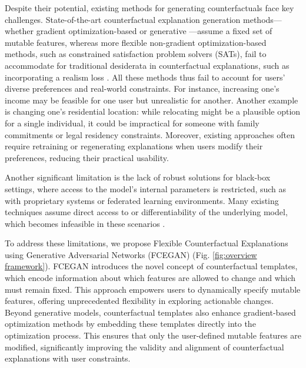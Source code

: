 \documentclass[runningheads]{llncs}
\begin{document}
Despite their potential, existing methods for generating counterfactuals face key challenges. State-of-the-art counterfactual explanation generation methods— whether gradient optimization-based \cite{poyiadzi2020face,joshi2019towards,mothilal2020explaining,van2021interpretable} or generative \cite{nemirovsky_2022_countergan,vanlooveren_2021_conditional,singla_2021_explaining}—assume a fixed set of mutable features, whereas more flexible non-gradient optimization-based methods, such as constrained satisfaction problem solvers (SATs), fail to accommodate for traditional desiderata in counterfactual explanations, such as incorporating a realism loss \cite{barzekar2023achievable,rasouli2024care,salimi2023towards}. All these methods thus fail to account for users' diverse preferences and real-world constraints. For instance, increasing one's income may be feasible for one user but unrealistic for another. Another example is changing one's residential location: while relocating might be a plausible option for a single individual, it could be impractical for someone with family commitments or legal residency constraints. Moreover, existing approaches often require retraining or regenerating explanations when users modify their preferences, reducing their practical usability. 

Another significant limitation is the lack of robust solutions for black-box settings, where access to the model's internal parameters is restricted, such as with proprietary systems or federated learning environments. Many existing techniques assume direct access to or differentiability of the underlying model, which becomes infeasible in these scenarios \cite{joshi2019towards,mothilal2020explaining,vanlooveren_2021_conditional,karimi2020model}.

To address these limitations, we propose Flexible Counterfactual Explanations using Generative Adversarial Networks (FCEGAN) (Fig. \ref{fig:overview framework}). FCEGAN introduces the novel concept of counterfactual templates, which encode information about which features are allowed to change and which must remain fixed. This approach empowers users to dynamically specify mutable features, offering unprecedented flexibility in exploring actionable changes. Beyond generative models, counterfactual templates also enhance gradient-based optimization methods by embedding these templates directly into the optimization process. This ensures that only the user-defined mutable features are modified, significantly improving the validity and alignment of counterfactual explanations with user constraints.
\end{document}
